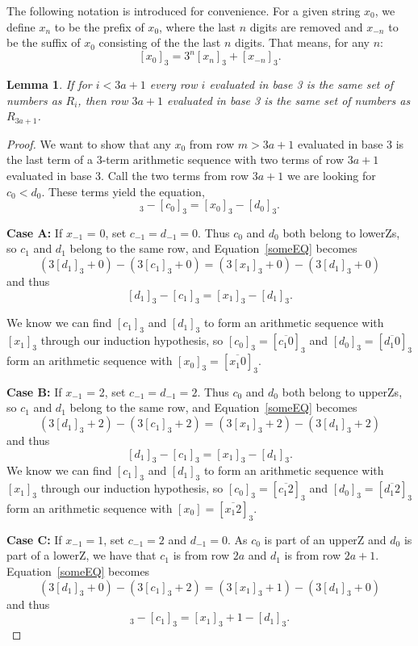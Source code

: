 \documentclass[12pt,reqno]{article}
\theoremstyle{plain}
\newtheorem{lemma}[theorem]{Lemma}
\theoremstyle{definition}
\theoremstyle{remark}
\begin{document}
The following notation is introduced for convenience. For a given string $x_0$, we define $x_n$ to be the prefix of $x_0$, where the last $n$ digits are removed and $x_{-n}$ to be the suffix of $x_0$ consisting of the the last $n$ digits. That means, for any $n$: \[[x_0]_3 = 3^{n}[x_n]_3+[x_{-n}]_3.\]

\begin{lemma} \label{lemma:3a+1}
If for $i < 3a+1$ every row $i$ evaluated in base 3 is the same set of numbers as $R_i$, then row $3a+1$ evaluated in base 3 is the same set of numbers as $R_{3a+1}$.
\end{lemma}
\begin{proof}
We want to show that any $x_0$ from row $m>3a+1$ evaluated in base 3 is the last term of a 3-term arithmetic sequence with two terms of row $3a+1$ evaluated in base 3. Call the two terms from row $3a+1$ we are looking for $c_0<d_0$. These terms yield the equation,
\begin{equation}
[d_0]_3-[c_0]_3 = [x_0]_3-[d_0]_3.
\label{someEQ}
\end{equation}

\textbf{Case A:} If $x_{-1}$ = 0, set $c_{-1} = d_{-1} = 0$. Thus $c_0$ and $d_0$ both belong to lowerZs, so $c_1$ and $d_1$ belong to the same row, and Equation~\eqref{someEQ} becomes
\[
(3[d_1]_3+0) - (3[c_1]_3+0) = (3[x_1]_3+0) - (3[d_1]_3+0)
\]
and thus
\[
[d_1]_3 - [c_1]_3 = [x_1]_3 - [d_1]_3.
\]

We know we can find $[c_1]_3$ and $[d_1]_3$ to form an arithmetic sequence with $[x_1]_3$ through our induction hypothesis, so $[c_0]_3 = [\overline{c_1 0}]_3$ and $[d_0]_3 = [\overline{d_1 0}]_3$ form an arithmetic sequence with $[x_0]_3 = [\overline{x_1 0}]_3$.

\textbf{Case B:} If $x_{-1}$ = 2, set $c_{-1} = d_{-1} = 2$. Thus $c_0$ and $d_0$ both belong to upperZs, so $c_1$ and $d_1$ belong to the same row, and Equation~\eqref{someEQ} becomes
\[
(3[d_1]_3+2) - (3[c_1]_3+2) = (3[x_1]_3+2) - (3[d_1]_3+2)
\]
and thus
\[
[d_1]_3 - [c_1]_3 = [x_1]_3 - [d_1]_3.
\]
We know we can find $[c_1]_3$ and $[d_1]_3$ to form an arithmetic sequence with $[x_1]_3$ through our induction hypothesis, so $[c_0]_3 = [\overline{c_1 2}]_3$ and $[d_0]_3 = [\overline{d_1 2}]_3$ form an arithmetic sequence with $[x_0] = [\overline{x_1 2}]_3$.

\textbf{Case C:} If $x_{-1} = 1$, set $c_{-1} = 2$ and $d_{-1} = 0$. As $c_0$ is part of an upperZ and $d_0$ is part of a lowerZ, we have that $c_1$ is from row $2a$ and $d_1$ is from row $2a+1$. Equation~\eqref{someEQ} becomes
\[
(3[d_1]_3+0) - (3[c_1]_3+2) = (3[x_1]_3+1) - (3[d_1]_3+0)
\]
and thus
\begin{equation}
[d_1]_3-[c_1]_3  = [x_1]_3 + 1-[d_1]_3.
\label{secondEQ}
\end{equation}


\end{proof}
\end{document}
